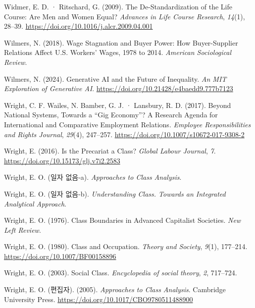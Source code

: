 \documentclass[
  letterpaper,
  DIV=11,
  numbers=noendperiod]{scrartcl}
\newlength{\cslhangindent}
\newenvironment{CSLReferences}[2] %
 {\begin{list}{}{%
  \setlength{\itemindent}{0pt}
  \setlength{\leftmargin}{0pt}
  \setlength{\parsep}{0pt}
  \ifodd #1
   \setlength{\leftmargin}{\cslhangindent}
   \setlength{\itemindent}{-1\cslhangindent}
  \fi
  \setlength{\itemsep}{#2\baselineskip}}}
 {\end{list}}
\begin{document}
\begin{CSLReferences}{1}{0}
Widmer, E. D. · Ritschard, G. (2009). The De-Standardization of the Life
Course: {Are} Men and Women Equal? \emph{Advances in Life Course
Research}, \emph{14}(1), 28--39.
\url{https://doi.org/10.1016/j.alcr.2009.04.001}

Wilmers, N. (2018). Wage {Stagnation} and {Buyer Power}: {How
Buyer-Supplier Relations Affect U}.{S}. {Workers}' {Wages}, 1978 to
2014. \emph{American Sociological Review}.

Wilmers, N. (2024). Generative {AI} and the {Future} of {Inequality}.
\emph{An MIT Exploration of Generative AI}.
\url{https://doi.org/10.21428/e4baedd9.777b7123}

Wright, C. F. Wailes, N. Bamber, G. J. · Lansbury, R. D. (2017). Beyond
{National Systems}, {Towards} a {``{Gig Economy}''}? {A Research Agenda}
for {International} and {Comparative Employment Relations}.
\emph{Employee Responsibilities and Rights Journal}, \emph{29}(4),
247--257. \url{https://doi.org/10.1007/s10672-017-9308-2}

Wright, E. (2016). Is the {Precariat} a {Class}? \emph{Global Labour
Journal}, \emph{7}. \url{https://doi.org/10.15173/glj.v7i2.2583}

Wright, E. O. (일자 없음-a). \emph{Approaches to {Class Analysis}}.

Wright, E. O. (일자 없음-b). \emph{Understanding {Class}. {Towards} an
{Integrated Analytical Approach}}.

Wright, E. O. (1976). Class {Boundaries} in {Advanced Capitalist
Societies}. \emph{New Left Review}.

Wright, E. O. (1980). Class and Occupation. \emph{Theory and Society},
\emph{9}(1), 177--214. \url{https://doi.org/10.1007/BF00158896}

Wright, E. O. (2003). Social Class. \emph{Encyclopedia of social
theory}, \emph{2}, 717--724.

Wright, E. O. (편집자). (2005). \emph{Approaches to {Class Analysis}}.
Cambridge University Press.
\url{https://doi.org/10.1017/CBO9780511488900}


\end{CSLReferences}
\end{document}
